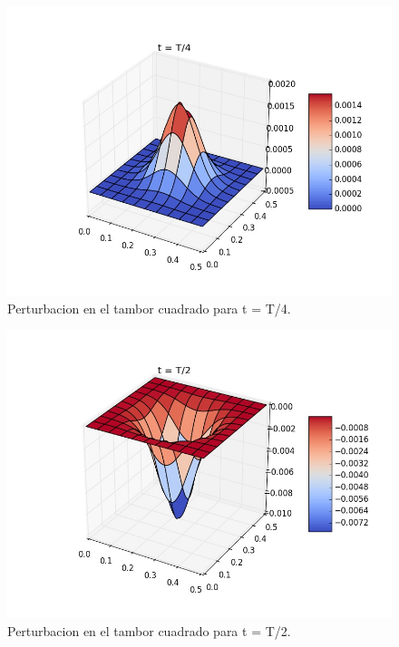 \documentclass{article}
\begin{document}
\begin{center}
  \begin{figure}[t]
    \includegraphics[width=\textwidth]{tambor_t4}
    \centering
    \\
    Perturbacion en el tambor cuadrado para t = T/4.
  \end{figure}

  \begin{figure}[t]
    \includegraphics[width=\textwidth]{tambor_t2}
    \centering
    \\
    Perturbacion en el tambor cuadrado para t = T/2.
  \end{figure}
 
 
\end{center}
\end{document}
